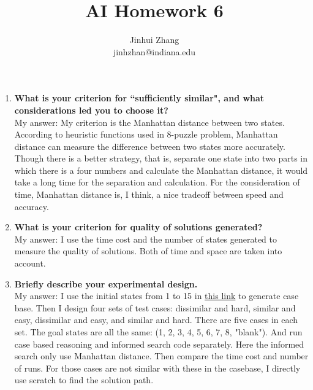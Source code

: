 \documentclass[12pt]{article}
\begin{document}
\title{AI Homework 6}
\author{Jinhui Zhang\\
jinhzhan@indiana.edu}  
\maketitle
\begin{enumerate}
\item \textbf{What is your criterion for ``sufficiently similar", and what considerations led you to choose it?}\\
My answer: My criterion is the Manhattan distance between two states. According to heuristic functions used in 8-puzzle problem, Manhattan distance can measure the difference between two states more accurately. Though there is a better strategy, that is, separate one state into two parts in which there is a four numbers and calculate the Manhattan distance, it would take a long time for the separation and calculation. For the consideration of time, Manhattan distance is, I think, a nice tradeoff between speed and accuracy. 

\item \textbf{What is your criterion for quality of solutions generated?  }\\
My answer: I use the time cost and the number of states generated to measure the quality of solutions. Both of time and space are taken into account. 

\item \textbf{Briefly describe your experimental design.}\\
My answer: I use the initial states from 1 to 15 in \href{http://www.cs.indiana.edu/classes/b551/sample8puzzleStates.py}{this link} to generate case base. Then I design four sets of test cases: dissimilar and hard, similar and easy, dissimilar and easy, and similar and hard. There are five cases in each set. The goal states are all the same: (1, 2, 3, 4, 5, 6, 7, 8, "blank"). And run case based reasoning and informed search code separately. Here the informed search only use Manhattan distance. Then compare the time cost and number of runs. For those cases are not similar with these in the casebase, I directly use scratch to find the solution path. 


\end{enumerate}
\end{document}
